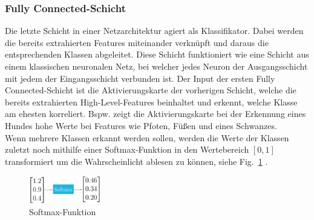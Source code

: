 \subsubsection{Fully Connected-Schicht}
Die letzte Schicht in einer Netzarchitektur agiert als Klassifikator. Dabei werden die bereits extrahierten Features miteinander verknüpft und daraus die entsprechenden Klassen abgeleitet. Diese Schicht funktioniert wie eine Schicht aus einem klassischen neuronalen Netz, bei welcher jedes Neuron der Ausgangsschicht mit jedem der Eingangsschicht verbunden ist. Der Input der ersten Fully Connected-Schicht ist die Aktivierungskarte der vorherigen Schicht, welche die bereits extrahierten High-Level-Features beinhaltet und erkennt, welche Klasse am ehesten korreliert. Bspw. zeigt die Aktivierungskarte bei der Erkennung eines Hundes hohe Werte bei Features wie Pfoten, Füßen und eines Schwanzes.\\
Wenn mehrere Klassen erkannt werden sollen, werden die Werte der Klassen zuletzt noch mithilfe einer Softmax-Funktion in den Wertebereich $[0,1]$ transformiert um die Wahrscheinlicht ablesen zu können, siehe Fig.~\ref{fig-softmax} \cite{Deshpande.27.04.2018}.

\begin{figure}[htbp]
\centerline{\includegraphics[height=1.2cm]{img/softmax.png}}
\caption{Softmax-Funktion\cite{JiYang.2017}}
\label{fig-softmax}
\end{figure}

